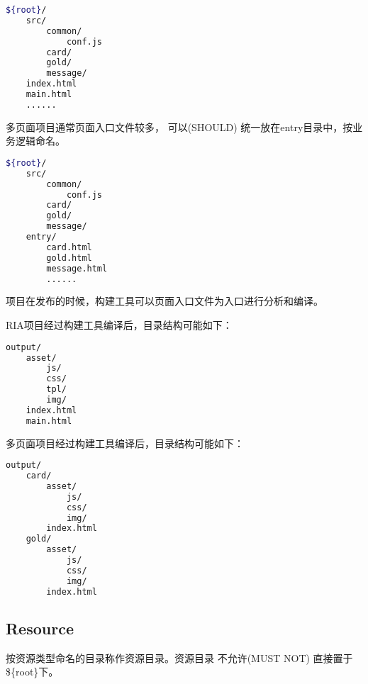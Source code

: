 \begin{lstlisting}[language=bash]
${root}/
    src/
        common/
            conf.js
        card/
        gold/
        message/
    index.html
    main.html
    ......
\end{lstlisting}

多页面项目通常页面入口文件较多， 可以(SHOULD) 统一放在entry目录中，按业务逻辑命名。

\begin{lstlisting}[language=bash]
${root}/
    src/
        common/
            conf.js
        card/
        gold/
        message/
    entry/
        card.html
        gold.html
        message.html
        ......
\end{lstlisting}


项目在发布的时候，构建工具可以页面入口文件为入口进行分析和编译。

RIA项目经过构建工具编译后，目录结构可能如下：

\begin{lstlisting}[language=bash]
output/
    asset/
        js/
        css/
        tpl/
        img/
    index.html
    main.html
\end{lstlisting}

多页面项目经过构建工具编译后，目录结构可能如下：

\begin{lstlisting}[language=bash]
output/
    card/
        asset/
            js/
            css/
            img/
        index.html
    gold/
        asset/
            js/
            css/
            img/
        index.html
\end{lstlisting}


\subsection{Resource}


按资源类型命名的目录称作资源目录。资源目录 不允许(MUST NOT) 直接置于\$\{root\}下。


